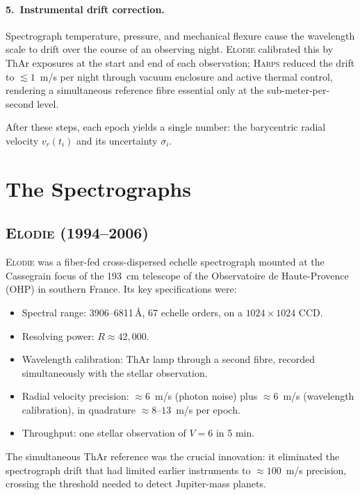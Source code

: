 \documentclass[12pt]{article}
\begin{document}
\paragraph{5.\ Instrumental drift correction.}
Spectrograph temperature, pressure, and mechanical flexure cause the
wavelength scale to drift over the course of an observing night.
\textsc{Elodie} calibrated this by ThAr exposures at the start and end
of each observation; \textsc{Harps} reduced the drift to $\lesssim
1$~m/s per night through vacuum enclosure and active thermal control,
rendering a simultaneous reference fibre essential only at the
sub-meter-per-second level.

After these steps, each epoch yields a single number: the barycentric
radial velocity $v_r(t_i)$ and its uncertainty $\sigma_i$.

\section{The Spectrographs}
\label{sec:instrument}

\subsection{\textsc{Elodie} (1994--2006)}

\textsc{Elodie} \citep{Baranne1996} was a fiber-fed cross-dispersed
echelle spectrograph mounted at the Cassegrain focus of the 193~cm
telescope of the Observatoire de Haute-Provence (OHP) in southern
France.  Its key specifications were:
\begin{itemize}
  \item Spectral range: 3906--6811\,\AA, 67 echelle orders, on a
    $1024\times1024$ CCD.
  \item Resolving power: $R \approx 42{,}000$.
  \item Wavelength calibration: ThAr lamp through a second fibre,
    recorded simultaneously with the stellar observation.
  \item Radial velocity precision: $\approx 6$~m/s (photon noise) plus
    $\approx 6$~m/s (wavelength calibration), in quadrature
    $\approx 8$--$13$~m/s per epoch.
  \item Throughput: one stellar observation of $V = 6$ in 5 min.
\end{itemize}
The simultaneous ThAr reference was the crucial innovation:
it eliminated the spectrograph drift that had limited earlier
instruments to $\approx 100$~m/s precision, crossing the threshold
needed to detect Jupiter-mass planets.
\end{document}
